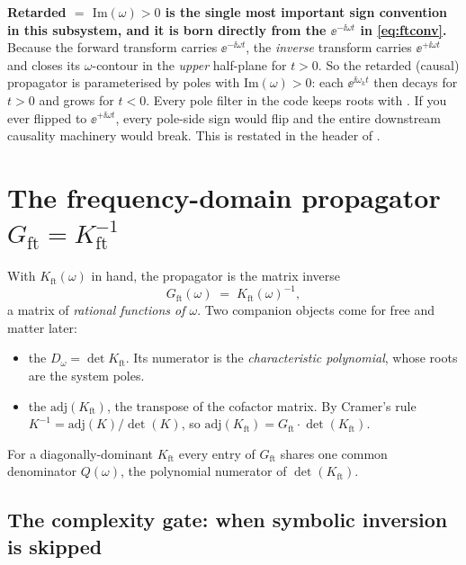 \begin{gotcha}
\textbf{Retarded $=$ $\mathrm{Im}(\omega) > 0$ is the single most important sign
convention in this subsystem, and it is born directly from the $\ee^{-\ii\omega
t}$ in \eqref{eq:ftconv}.} Because the forward transform carries
$\ee^{-\ii\omega t}$, the \emph{inverse} transform carries $\ee^{+\ii\omega t}$
and closes its $\omega$-contour in the \emph{upper} half-plane for $t > 0$. So the
retarded (causal) propagator is parameterised by poles with $\mathrm{Im}(\omega) >
0$: each $\ee^{\ii\omega_k t}$ then decays for $t > 0$ and grows for $t < 0$.
Every pole filter in the code keeps roots with . If you ever
flipped  to $\ee^{+\ii\omega t}$, every pole-side sign
would flip and the entire downstream causality machinery would break. This is
restated in the header of .
\end{gotcha}

\section{The frequency-domain propagator \texorpdfstring{$G_{\mathrm{ft}} = K_{\mathrm{ft}}^{-1}$}{G = K-inverse}}

With $K_{\mathrm{ft}}(\omega)$ in hand, the propagator is the matrix inverse
\begin{equation}
  G_{\mathrm{ft}}(\omega) \;=\; K_{\mathrm{ft}}(\omega)^{-1},
  \label{eq:Ginv}
\end{equation}
a matrix of \emph{rational functions of $\omega$}. Two companion objects come for
free and matter later:

\begin{itemize}
  \item the  $D_\omega = \det K_{\mathrm{ft}}$. Its numerator is
        the \emph{characteristic polynomial}, whose roots are the system poles.
  \item the  $\mathrm{adj}(K_{\mathrm{ft}})$, the transpose of the
        cofactor matrix. By Cramer's rule $K^{-1} = \mathrm{adj}(K)/\det(K)$, so
        $\mathrm{adj}(K_{\mathrm{ft}}) = G_{\mathrm{ft}}\cdot\det(K_{\mathrm{ft}})$.
\end{itemize}

For a diagonally-dominant $K_{\mathrm{ft}}$ every entry of $G_{\mathrm{ft}}$
shares one common denominator $Q(\omega)$, the polynomial numerator of
$\det(K_{\mathrm{ft}})$.

\subsection{The complexity gate: when symbolic inversion is skipped}

